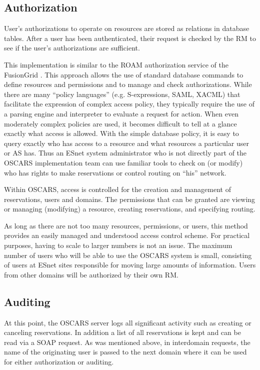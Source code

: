 \documentclass[conference]{IEEEtran}
\begin{document}
\subsection{Authorization}
User's authorizations to operate on resources are stored as relations
in database tables.  After a user has been authenticated, their request
is checked by the RM to see if the user's authorizations are sufficient.

This implementation is similar to the ROAM authorization service of the
FusionGrid \cite{burruss}.  This approach allows the use of standard database
commands to define resources and permissions and to manage and check
authorizations.
While there are many ``policy languages'' (e.g. S-expressions,
SAML, XACML) that facilitate the expression of complex access policy, they
typically require the use of a parsing engine and interpreter to evaluate a 
request for action. When even moderately complex policies are used, it
becomes difficult to tell at a glance exactly what access is allowed. With the 
simple database policy, it is easy to query exactly who has access to a 
resource and what resources a particular user or AS  has. Thus an ESnet system 
administrator who is
not directly part of the OSCARS implementation team can use familiar tools to 
check on (or modify)
who has rights to make reservations or control routing on ``his'' network. 

Within OSCARS, access is controlled for the creation and management of 
reservations, users and domains. The permissions that can
be granted are viewing or managing (modifying) a resource, creating
reservations, and specifying routing.

As long as there are not too many resources, permissions, or users, this
method provides an easily managed and understood access control scheme.
For practical purposes, having to scale to larger numbers is not an
issue.  The maximum number of users who will be able to use the OSCARS
system is small, consisting of users at ESnet sites responsible for moving
large amounts of information.  Users from other domains will be authorized by
their own RM.

\subsection{Auditing}
At this point, the OSCARS server logs all significant activity such as
creating or canceling reservations. In addition a list of all
reservations is kept and can be read via a SOAP request.
As was mentioned above, in interdomain requests, the name
of the originating user is passed to the next domain where it can be
used for either authorization or auditing.
\end{document}
